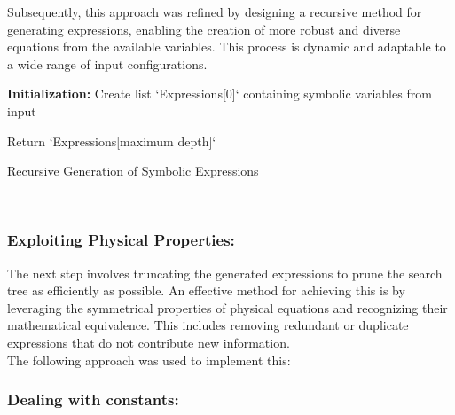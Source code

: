 \documentclass{article}
\begin{document}
Subsequently, this approach was refined by designing a recursive method for generating expressions, enabling the creation of more robust and diverse equations from the available variables. This process is dynamic and adaptable to a wide range of input configurations.\\




\begin{algorithm}[H]
\SetAlgoLined
{}

\textbf{Initialization:}\;
Create list `Expressions[0]` containing symbolic variables from input\;


Return `Expressions[maximum depth]`\;

\caption{Recursive Generation of Symbolic Expressions}
\label{alg:recursive_expressions} %
\end{algorithm}\\


\subsubsection{ Exploiting Physical Properties: }


The next step involves truncating the generated expressions to prune the search tree as efficiently as possible. An effective method for achieving this is by leveraging the symmetrical properties of physical equations and recognizing their mathematical equivalence. This includes removing redundant or duplicate expressions that do not contribute new information.\\

The following approach was used to implement this:\\



\subsubsection{Dealing with constants:}
\end{document}
